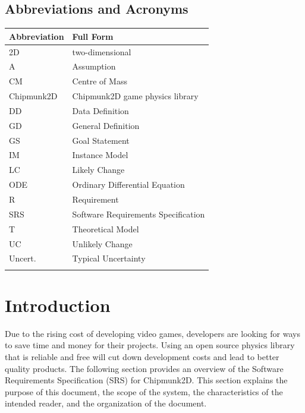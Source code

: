 \documentclass[12pt]{article}
\begin{document}
\subsection{Abbreviations and Acronyms}
\label{Sec:TAbbAcc}
\begin{longtable*}{l l}
\toprule
Abbreviation & Full Form
\\
\midrule
\endhead
2D & two-dimensional
\\
A & Assumption
\\
CM & Centre of Mass
\\
Chipmunk2D & Chipmunk2D game physics library
\\
DD & Data Definition
\\
GD & General Definition
\\
GS & Goal Statement
\\
IM & Instance Model
\\
LC & Likely Change
\\
ODE & Ordinary Differential Equation
\\
R & Requirement
\\
SRS & Software Requirements Specification
\\
T & Theoretical Model
\\
UC & Unlikely Change
\\
Uncert. & Typical Uncertainty
\\
\bottomrule
\label{Table:TAbbAcc}
\end{longtable*}
\section{Introduction}
\label{Sec:Intro}
Due to the rising cost of developing video games, developers are looking for ways to save time and money for their projects. Using an open source physics library that is reliable and free will cut down development costs and lead to better quality products.
The following section provides an overview of the Software Requirements Specification (SRS) for Chipmunk2D. This section explains the purpose of this document, the scope of the system, the characteristics of the intended reader, and the organization of the document.
\end{document}
